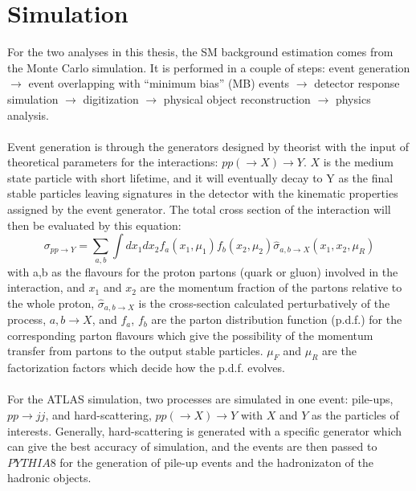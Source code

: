 \section{Simulation}
\label{sec:simulation}
For the two analyses in this thesis, the SM background estimation comes from the Monte Carlo simulation. It is performed in a couple of steps: event generation $\rightarrow$ event overlapping with ``minimum bias'' (MB) events $\rightarrow$  detector response simulation $\rightarrow$ digitization $\rightarrow$ physical object reconstruction $\rightarrow$ physics analysis.
\\
\\Event generation is through the generators designed by theorist with the input of theoretical parameters for the interactions: $pp(\rightarrow X)\rightarrow Y$. $X$ is the medium state particle with short lifetime, and it will eventually decay to Y as the final stable particles leaving signatures in the detector with the kinematic properties assigned by the event generator. The total cross section of the interaction will then be evaluated by this equation: 
\begin{equation}
\sigma_{pp\rightarrow Y} = \sum_{a,b} \int dx_{1}dx_{2}f_{a}(x_{1},\mu_{1})f_{b}(x_{2},\mu_{2})\hat{\sigma}_{a,b\rightarrow X}(x_{1},x_{2},\mu_{R})
\end{equation}
with a,b as the flavours for the proton partons (quark or gluon) involved in the interaction, and $x_{1}$ and $x_{2}$ are the momentum fraction of the partons relative to the whole proton, $\hat{\sigma}_{a,b\rightarrow X}$ is the cross-section calculated perturbatively of the process, $a,b\rightarrow X$, and $f_{a}$, $f_{b}$ are the parton distribution function (p.d.f.) for the corresponding parton flavours which give the possibility of the momentum transfer from partons to the output stable particles. $\mu_{F}$ and $\mu_{R}$ are the factorization factors which decide how the p.d.f. evolves. 
\\
\\For the ATLAS simulation, two processes are simulated in one event: pile-ups, $pp\rightarrow jj$, and hard-scattering, $pp(\rightarrow X)\rightarrow Y$ with $X$ and $Y$ as the particles of interests. Generally, hard-scattering is generated with a specific generator which can give the best accuracy of simulation, and the events are then passed to $PYTHIA8$ for the generation of pile-up events and the hadronizaton of the hadronic objects. 
\\
